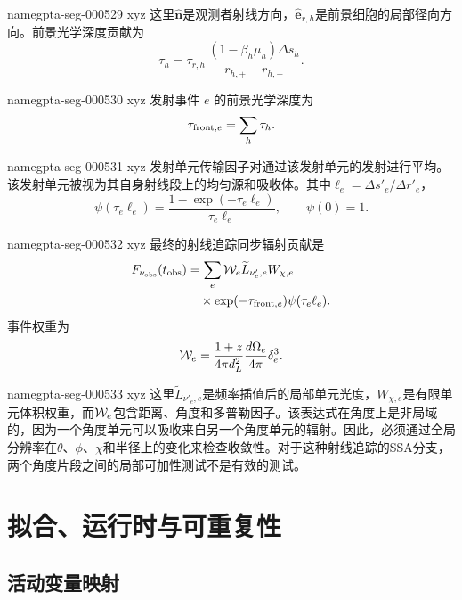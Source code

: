 \documentclass[twocolumn]{aastex702}
\makeatletter
\providecommand{\gptareaderanchor}[1]{\pdfdest name{#1} xyz}%
\providecommand{\gptareaderanchor}[1]{\special{pdf:dest (#1) [ @thispage /XYZ @xpos @ypos null ]}}%
\makeatother
\begin{document}
\gptareaderanchor{gpta-seg-000529}%
这里\(\hat{\boldsymbol n}\)是观测者射线方向，\(\hat{\boldsymbol e}_{r,h}\)是前景细胞的局部径向方向。前景光学深度贡献为
\begin{equation}
\tau_h=
\tau_{r,h}\,
\frac{(1-\beta_h\mu_h)\Delta s_h}
{r_{h,+}-r_{h,-}} .
\end{equation}

\gptareaderanchor{gpta-seg-000530}%
发射事件 \(e\) 的前景光学深度为
\begin{equation}
\tau_{{\rm front},e}=\sum_h\tau_h .
\end{equation}


\gptareaderanchor{gpta-seg-000531}%
发射单元传输因子对通过该发射单元的发射进行平均。该发射单元被视为其自身射线段上的均匀源和吸收体。其中\(\ell_e=\Delta s'_e/\Delta r'_e\)，
\begin{equation}
\psi(\tau_e\ell_e)=
\frac{1-\exp(-\tau_e\ell_e)}{\tau_e\ell_e},
\qquad
\psi(0)=1 .
\end{equation}

\gptareaderanchor{gpta-seg-000532}%
最终的射线追踪同步辐射贡献是
\begin{equation}
\begin{aligned}
F_{\nu_{\rm obs}}(t_{\rm obs})&=
\sum_e{\cal W}_e \widetilde L_{\nu'_e,e}W_{\chi,e}\\
&\quad \times
\exp(-\tau_{{\rm front},e})
\psi(\tau_e\ell_e).
\end{aligned}
\end{equation}
事件权重为
\begin{equation}
{\cal W}_e=
\frac{1+z}{4\pi d_L^2}
\frac{d\Omega_e}{4\pi}
\delta_e^3 .
\end{equation}

\gptareaderanchor{gpta-seg-000533}%
这里\(\widetilde L_{\nu'_e,e}\)是频率插值后的局部单元光度，\(W_{\chi,e}\)是有限单元体积权重，而\({\cal W}_e\)包含距离、角度和多普勒因子。该表达式在角度上是非局域的，因为一个角度单元可以吸收来自另一个角度单元的辐射。因此，必须通过全局分辨率在\(\theta\)、\(\phi\)、\(\chi\)和半径上的变化来检查收敛性。对于这种射线追踪的SSA分支，两个角度片段之间的局部可加性测试不是有效的测试。

\section{拟合、运行时与可重复性} \label{sec:fitting}

\subsection{活动变量映射}
\end{document}
